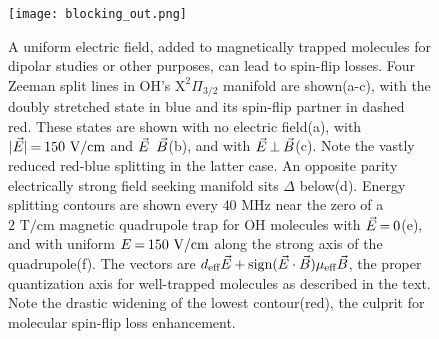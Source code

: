 \documentclass[%
 reprint,
 amsmath,amssymb,
 aps,
prl,
]{revtex4-1}
\newcommand{\epb}{{$\vec{E}\s {\perp}\s\vec{B}$}}
\newcommand{\s}{{\nobreak\hspace{.2em}}}
\begin{document}

\begin{figure}[tb]
\texttt{[image: blocking\_out.png]}%
\caption{
A uniform electric field, added to magnetically trapped molecules for dipolar studies or other purposes, can lead to spin-flip losses. 
Four Zeeman split lines in OH's $\mathrm{X}^2\Pi_{3/2}$ manifold are shown\s(a-c), with the doubly stretched state in blue and its spin-flip partner in dashed red. 
These states are shown with no electric field\s(a), with $|\vec{E}|\s {=}\s 150\text{ V/cm}$ and $\vec{E}\s $\raisebox{1px}{${\parallel}$}$\s\vec{B}$\s(b), and with \epb{}\s(c). 
Note the vastly reduced red-blue splitting in the latter case. 
An opposite parity electrically strong field seeking manifold sits $\Delta$ below\s(d). 
Energy splitting contours are shown every $40\text{ MHz}$ near the zero of a $2\text{ T/cm}$ magnetic quadrupole trap for OH molecules\s\cite{Stuhl2012uwave} with $\vec{E}\s {=}\s 0$\s(e), and with uniform $E\s {=}\s 150\text{ V/cm}$ along the strong axis of the quadrupole\s(f). 
The vectors are $d_\text{eff}\vec{E}\s {+}\s\text{sign}(\vec{E}\cdot\vec{B})\mu_\text{eff}\vec{B}$, the proper quantization axis for well-trapped molecules as described in the text. 
Note the drastic widening of the lowest contour\s(red), the culprit for molecular spin-flip loss enhancement.
}
\label{fig:blocking}
\end{figure}
\end{document}
